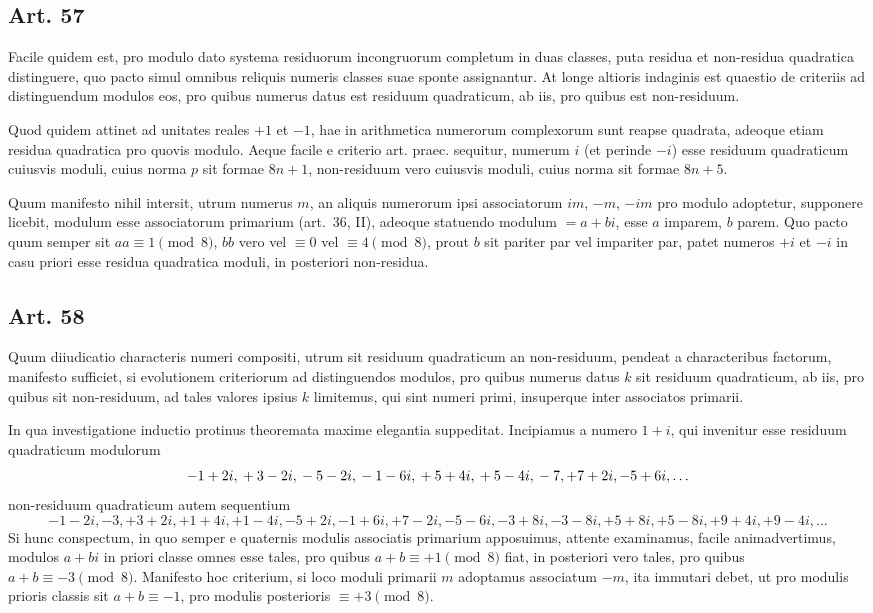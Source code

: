 \documentclass[12pt]{article}
\newcommand{\art}[1]{\subsection*{Art. #1}}
\begin{document}
\art{57}
Facile quidem est, pro modulo dato systema residuorum incongruorum completum in duas classes, puta residua et non-residua quadratica distinguere, quo pacto simul omnibus reliquis numeris classes suae sponte assignantur. At longe altioris indaginis est quaestio de criteriis ad distinguendum modulos eos, pro quibus numerus datus est residuum quadraticum, ab iis, pro quibus est non-residuum.

Quod quidem attinet ad unitates reales $+1$ et $-1$, hae in arithmetica numerorum complexorum sunt reapse quadrata, adeoque etiam residua quadratica pro quovis modulo. Aeque facile e criterio art. praec. sequitur, numerum $i$ (et perinde $-i$) esse residuum quadraticum cuiusvis moduli, cuius norma $p$ sit formae $8n+1$, non-residuum vero cuiusvis moduli, cuius norma sit formae $8n+5$.

Quum manifesto nihil intersit, utrum numerus $m$, an aliquis numerorum ipsi associatorum $im$, $-m$, $-im$ pro modulo adoptetur, supponere licebit, modulum esse associatorum primarium (art.~36, II), adeoque statuendo modulum $=a+bi$, esse $a$ imparem, $b$ parem. Quo pacto quum semper sit $aa\equiv1\pmod 8$, $bb$ vero vel $\equiv0$ vel $\equiv4\pmod 8$, prout $b$ sit pariter par vel impariter par, patet numeros $+i$ et $-i$ in casu priori esse residua quadratica moduli, in posteriori non-residua.

\art{58}
Quum diiudicatio characteris numeri compositi, utrum sit residuum quadraticum an non-residuum, pendeat a characteribus factorum, manifesto sufficiet, si evolutionem criteriorum ad distinguendos modulos, pro quibus numerus datus $k$ sit residuum quadraticum, ab iis, pro quibus sit non-residuum, ad tales valores ipsius $k$ limitemus, qui sint numeri primi, insuperque inter associatos primarii.

In qua investigatione inductio protinus theoremata maxime elegantia suppeditat. Incipiamus a numero $1+i$, qui invenitur esse residuum quadraticum modulorum
\[
-1+2i,\\ +3-2i,\\ -5-2i,\\ -1-6i,\\ +5+4i,\\ +5-4i,\\ -7,
+7+2i,
-5+6i,\ldots
\]
non-residuum quadraticum autem sequentium
\[
-1-2i,
-3,
+3+2i,
+1+4i,
+1-4i,
-5+2i,
-1+6i,
+7-2i,
-5-6i,
-3+8i,
-3-8i,
+5+8i,
+5-8i,
+9+4i,
+9-4i,\ldots
\]
Si hunc conspectum, in quo semper e quaternis modulis associatis primarium apposuimus, attente examinamus, facile animadvertimus, modulos $a+bi$ in priori classe omnes esse tales, pro quibus $a+b\equiv+1\pmod 8$ fiat, in posteriori vero tales, pro quibus $a+b\equiv-3\pmod 8$. Manifesto hoc criterium, si loco moduli primarii $m$ adoptamus associatum $-m$, ita immutari debet, ut pro modulis prioris classis sit $a+b\equiv-1$, pro modulis posterioris $\equiv+3\pmod 8$.
\end{document}
